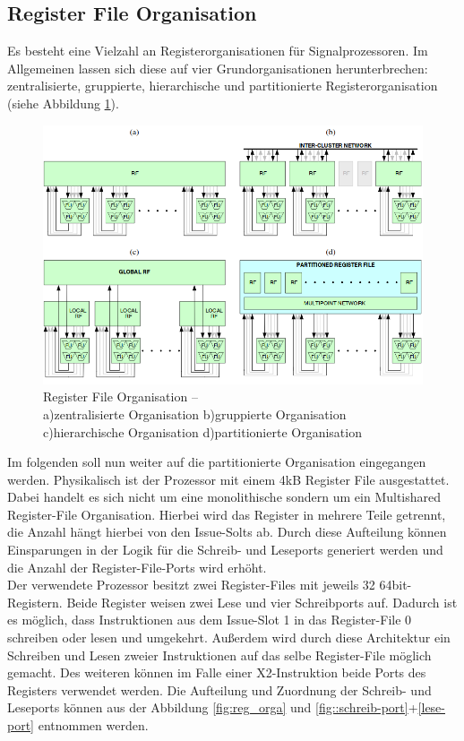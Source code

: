\subsection{Register File Organisation}
Es besteht eine Vielzahl an Registerorganisationen für Signalprozessoren. Im Allgemeinen lassen sich diese auf vier Grundorganisationen herunterbrechen: zentralisierte, gruppierte, hierarchische und partitionierte Registerorganisation (siehe Abbildung \ref{fig:RegisterOrga}).\newline
\begin{figure}[htbp] 
	\centering
	\includegraphics[width=\textwidth]{fig/Register_orga.png}
	\caption[Register File Organisation]{Register File Organisation –\\ a)zentralisierte Organisation b)gruppierte Organisation c)hierarchische Organisation d)partitionierte Organisation  \cite{paya2010multi}}
	\label{fig:RegisterOrga}
\end{figure}
\newline
Im folgenden soll nun weiter auf die partitionierte Organisation eingegangen werden. Physikalisch ist der Prozessor mit einem 4kB Register File ausgestattet. Dabei handelt es sich nicht um eine monolithische sondern um ein Multishared Register-File Organisation. Hierbei wird das Register in mehrere Teile getrennt, die Anzahl hängt hierbei von den Issue-Solts ab. Durch diese Aufteilung können Einsparungen in der Logik für die Schreib- und Leseports generiert werden und die Anzahl der Register-File-Ports wird erhöht.\\
Der verwendete Prozessor besitzt zwei Register-Files mit jeweils 32 64bit-Registern. Beide Register weisen zwei Lese und vier Schreibports auf. Dadurch ist es möglich, dass Instruktionen aus dem Issue-Slot 1 in das Register-File 0 schreiben oder lesen und umgekehrt. Außerdem wird durch diese Architektur ein Schreiben und Lesen zweier Instruktionen auf das selbe Register-File möglich gemacht. Des weiteren können im Falle einer X2-Instruktion beide Ports des Registers verwendet werden. Die Aufteilung und  Zuordnung der Schreib- und Leseports können aus der Abbildung \ref{fig:reg_orga} und \ref{fig::schreib-port}+\ref{lese-port} entnommen werden.



